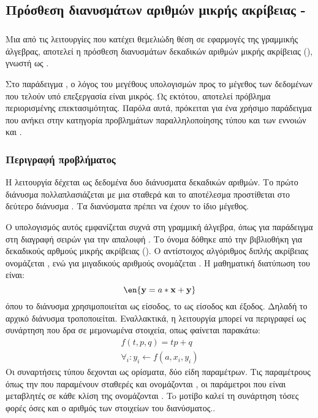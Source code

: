 \subsection{Πρόσθεση διανυσμάτων αριθμών μικρής ακρίβειας - \emph{}}
\subparagraph{}
Μια από τις λειτουργίες που κατέχει θεμελιώδη θέση σε εφαρμογές της γραμμικής άλγεβρας, αποτελεί η πρόσθεση διανυσμάτων
δεκαδικών αριθμών μικρής ακρίβειας (\emph{}), γνωστή ως \textbf{}.

Στο παράδειγμα \emph{}, ο λόγος του μεγέθους υπολογισμών προς το μέγεθος των δεδομένων που τελούν υπό επεξεργασία
είναι μικρός. Ως εκτότου, αποτελεί πρόβλημα περιορισμένης επεκτασιμότητας. Παρόλα αυτά, πρόκειται για ένα χρήσιμο
παράδειγμα που ανήκει στην κατηγορία προβλημάτων παραλληλοποίησης τύπου \emph{} και των εννοιών
\emph{} και \emph{}\cite{patters}.
\\
\subsubsection{Περιγραφή προβλήματος}
Η λειτουργία  δέχεται ως δεδομένα δυο διάνυσματα δεκαδικών αριθμών. Το πρώτο διάνυσμα πολλαπλασιάζεται με μια
σταθερά \emph{} και το αποτέλεσμα προστίθεται στο δεύτερο διάνυσμα \emph{}. Τα διανύσματα \emph{}
πρέπει να έχουν το ίδιο μέγεθος.

Ο υπολογισμός αυτός εμφανίζεται συχνά στη γραμμική άλγεβρα, όπως για παράδειγμα στη διαγραφή σειρών για την απαλοιφή
\textbf{}. Το όνομα \emph{} δόθηκε από την βιβλιοθήκη  για δεκαδικούς αρθμούς μικρής ακρίβειας (\emph{}). Ο αντίστοιχος αλγόριθμος διπλής ακρίβειας
ονομάζεται \emph{}, ενώ για μιγαδικούς αριθμούς ονομάζεται \emph{}.
Η μαθηματική διατύπωση του \emph{} είναι:
                              $$\en{\textbf{y} = a*\textbf{x} + \textbf{y}}$$ όπου το διάνυσμα \emph{}
χρησιμοποιείται ως είσοδος, το  ως είσοδος και έξοδος. Δηλαδή το αρχικό διάνυσμα \emph{}
τροποποιείται. Εναλλακτικά, η λειτουργία \emph{} μπορεί να περιγραφεί ως συνάρτηση που δρα σε μεμονωμένα
στοιχεία, οπως φαίνεται παρακάτω: 
\begin{equation*}\label{eq:pareto mle2}
\begin{aligned}
f(t, p, q) = tp + q\\
\forall _i : y_i \leftarrow f(a, x_i, y_i)
\end{aligned}
\end{equation*}
\clearpage
Οι συναρτήσεις τύπου \emph{} δεχονται ως ορίσματα, δύο είδη παραμέτρων. Τις παραμέτρους όπως την  που
παραμένουν σταθερές και ονομάζονται \emph{}, οι παράμετροι που είναι μεταβλητές σε κάθε κλίση της
\emph{} ονομάζονται \emph{}. To μοτίβο \emph{} καλεί τη συνάρτηση \emph{} τόσες φορές
όσες και ο αριθμός των στοιχείων του διανύσματος.\cite{patters}.


